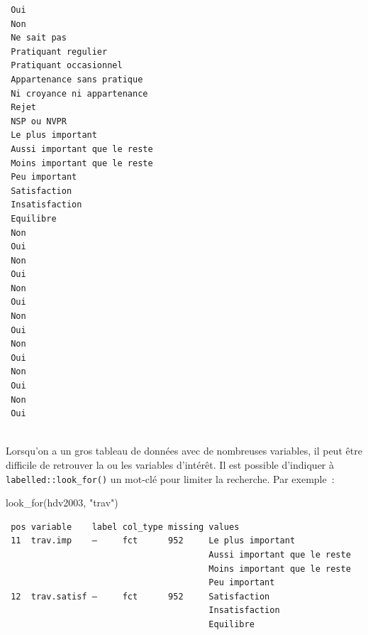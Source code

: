 \documentclass[
  letterpaper,
  DIV=11,
  numbers=noendperiod,
  oneside]{scrreprt}
\newenvironment{Shaded}{\begin{snugshade}}{\end{snugshade}}
\newcommand{\FunctionTok}[1]{\textcolor[rgb]{0.28,0.35,0.67}{#1}}
\newcommand{\NormalTok}[1]{\textcolor[rgb]{0.00,0.23,0.31}{#1}}
\newcommand{\StringTok}[1]{\textcolor[rgb]{0.13,0.47,0.30}{#1}}
\begin{document}
\begin{verbatim}
 Oui                                        
 Non                                        
 Ne sait pas                                
 Pratiquant regulier                        
 Pratiquant occasionnel                     
 Appartenance sans pratique                 
 Ni croyance ni appartenance                
 Rejet                                      
 NSP ou NVPR                                
 Le plus important                          
 Aussi important que le reste               
 Moins important que le reste               
 Peu important                              
 Satisfaction                               
 Insatisfaction                             
 Equilibre                                  
 Non                                        
 Oui                                        
 Non                                        
 Oui                                        
 Non                                        
 Oui                                        
 Non                                        
 Oui                                        
 Non                                        
 Oui                                        
 Non                                        
 Oui                                        
 Non                                        
 Oui                                        
                                            
\end{verbatim}

Lorsqu'on a un gros tableau de données avec de nombreuses variables, il
peut être difficile de retrouver la ou les variables d'intérêt. Il est
possible d'indiquer à \texttt{labelled::look\_for()} un mot-clé pour
limiter la recherche. Par exemple~:

\begin{Shaded}
\begin{Highlighting}[]
\FunctionTok{look\_for}\NormalTok{(hdv2003, }\StringTok{"trav"}\NormalTok{)}
\end{Highlighting}
\end{Shaded}

\begin{verbatim}
 pos variable    label col_type missing values                      
 11  trav.imp    —     fct      952     Le plus important           
                                        Aussi important que le reste
                                        Moins important que le reste
                                        Peu important               
 12  trav.satisf —     fct      952     Satisfaction                
                                        Insatisfaction              
                                        Equilibre                   
\end{verbatim}
\end{document}
